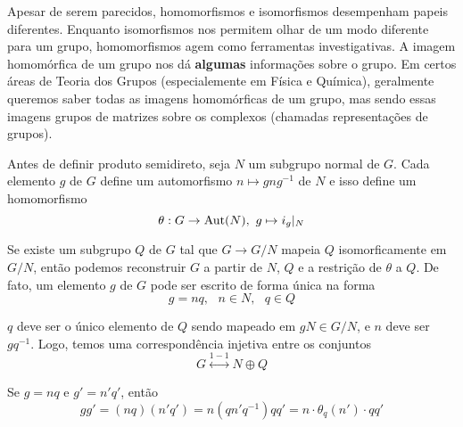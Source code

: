 	\par\vspace{0.3cm} Apesar de serem parecidos, homomorfismos e isomorfismos desempenham papeis diferentes. Enquanto isomorfismos nos permitem olhar de um modo diferente para um grupo, homomorfismos agem como ferramentas investigativas. A imagem homomórfica de um grupo nos dá \textbf{algumas} informações sobre o grupo. Em certos áreas de Teoria dos Grupos (especialemente em Física e Química), geralmente queremos saber todas as imagens homomórficas de um grupo, mas sendo essas imagens grupos de matrizes sobre os complexos (chamadas representações de grupos). 
	
	\par\vspace{0.3cm} Antes de definir produto semidireto, seja $N$ um subgrupo normal de $G$. Cada elemento $g$ de $G$ define um automorfismo $n\mapsto gng^{-1}$ de $N$ e isso define um homomorfismo
	\begin{equation*}
	\theta: G\to \operatorname{Aut}(N), \text{ }g\mapsto i_g|_N
	\end{equation*}
	\par\vspace{0.3cm} Se existe um subgrupo $Q$ de $G$ tal que $G\to G/N$ mapeia $Q$ isomorficamente em $G/N$, então podemos reconstruir $G$ a partir de $N$, $Q$ e a restrição de $\theta$ a $Q$. De fato, um elemento $g$ de $G$ pode ser escrito de forma única na forma
	\begin{equation*}
	g=nq, \text{ }n\in N, \text{ }q\in Q
	\end{equation*}
	\par\vspace{0.3cm} $q$ deve ser o único elemento de $Q$ sendo mapeado em $gN\in G/N$, e $n$ deve ser $gq^{-1}$. Logo, temos uma correspondência injetiva entre os conjuntos 
	\begin{equation*}
	G\overset{1-1}{\longleftrightarrow} N\oplus Q
	\end{equation*} 
	\par\vspace{0.3cm} Se $g=nq$ e $g'=n'q'$, então
	\begin{equation*}
	gg' = (nq)(n'q') = n(qn'q^{-1})qq' = n\cdot\theta_q(n')\cdot qq'
	\end{equation*}
	
